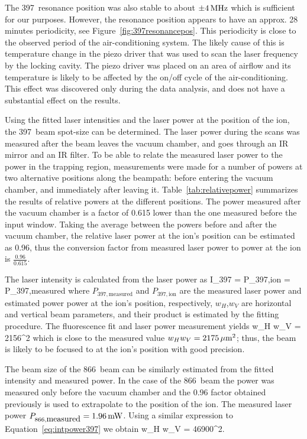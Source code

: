 The 397\nm\, resonance position was also stable to about $\pm 4\,\mbox{MHz}$ which is sufficient for our purposes. However, the resonance position appears to have an approx. 28 minutes periodicity, see Figure~\ref{fig:397resonancepos}. This periodicity is close to the observed period of the air-conditioning system. The likely cause of this is temperature change in the piezo driver that was used to scan the laser frequency by the locking cavity. The piezo driver was placed on an area of airflow and its temperature is likely to be affected by the on/off cycle of the air-conditioning. This effect was discovered only during the data analysis, and does not have a substantial effect on the results.


Using the fitted laser intensities and the laser power at the position of the ion, the 397\nm\, beam spot-size can be determined. The laser power during the scans was measured after the beam leaves the vacuum chamber, and goes through an IR mirror and an IR filter. To be able to relate the measured laser power to the power in the trapping region, measurements were made for a number of powers at two alternative positions along the beampath: before entering the vacuum chamber, and immediately after leaving it. Table~\ref{tab:relativepower} summarizes the results of relative powers at the different positions. The power measured after the vacuum chamber is a factor of 0.615 lower than the one measured before the input window. Taking the average between the powers before and after the vacuum chamber, the relative laser power at the ion's position can be estimated as 0.96, thus the conversion factor from measured laser power to power at the ion is $\frac{0.96}{0.615}$.

The laser intensity is calculated from the laser power as
\be
I_{397} =  P_{397,\mbox{ion}} = 
  P_{397,\mbox{measured}}
\label{eq:intpower397}
\ee
where $ P_{397,\mbox{measured}}$ and $ P_{397,\mbox{ion}}$ are the measured laser power and estimated power power at the ion's position, respectively, $w_H$,$w_V$ are horizontal and vertical beam parameters, and their product is estimated by the fitting procedure. The fluorescence fit and laser power measurement yields
\be
w_H w_V = 2156\um^2
\ee
which is close to the measured value $w_H w_V = 2175\,\mbox{$\mu$m}^2$; thus, the beam is likely to be focused to at the ion's position with good precision.

The beam size of the 866\nm\, beam can be similarly estimated from the fitted intensity and measured power. In the case of the 866\nm\, beam the power was measured only before the vacuum chamber and the 0.96 factor obtained previously is used to extrapolate to the position of the ion. The measured laser power $P_{866,\mbox{measured}} = 1.96\,\mbox{mW}$. Using a similar expression to Equation~\ref{eq:intpower397} we obtain
\be
w_H w_V = 46900\um^2.
\ee

